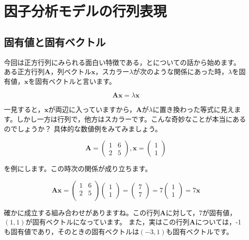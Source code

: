 \documentclass{ltjsbook}
\begin{document}
 
\chapter{因子分析モデルの行列表現} 
\label{chapter8} 

\section{固有値と固有ベクトル}
今回は正方行列にみられる面白い特徴である，とについての話から始めます。
ある正方行列$\bm{A}$，列ベクトル$\bm{x}$，スカラー$\lambda$が次のような関係にあった時，$\lambda$を固有値，$\bm{x}$を固有ベクトルと言います。

\[ \bm{Ax} = \lambda\bm{x} \]

一見すると，$\bm{x}$が両辺に入っていますから，$\bm{A}$が$\lambda$に置き換わった等式に見えます。しかし一方は行列で，他方はスカラーです。こんな奇妙なことが本当にあるのでしょうか？ 
具体的な数値例をみてみましょう。

\[
 \bm{A} = \begin{pmatrix} 
1 & 6 \\ 2 & 5 
\end{pmatrix}
,\bm{x} = \begin{pmatrix} 
1 \\ 1 
\end{pmatrix}
\]

を例にします。この時次の関係が成り立ちます。

\[
\bm{Ax} = 
\begin {pmatrix}
1 & 6 \\
2 & 5 \\
\end{pmatrix}
\begin{pmatrix}
1 \\ 1
\end{pmatrix}
=
\begin{pmatrix}
7 \\ 7
\end{pmatrix}
=7
\begin{pmatrix}
1 \\ 1
\end{pmatrix}
=7 \bm{x}
\]

確かに成立する組み合わせがありますね。この行列$\bm{A}$に対して，7が固有値，$(1,1)$が固有ベクトルになっています。
また，実はこの行列$\bm{A}$については，-1も固有値であり，そのときの固有ベクトルは$(-3,1)$も固有ベクトルです。
\end{document}
